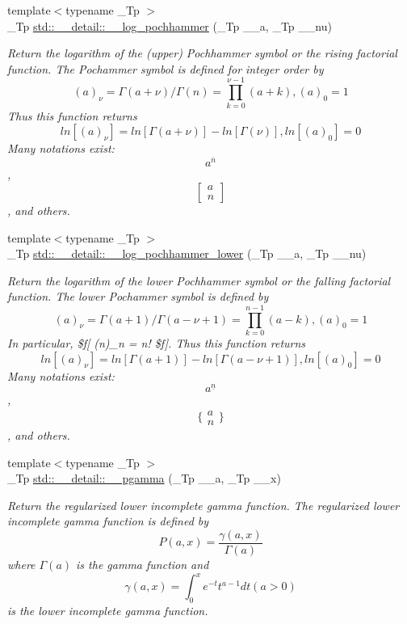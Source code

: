 \begin{DoxyCompactItemize}
\item 
{\footnotesize template$<$typename \+\_\+\+Tp $>$ }\\\+\_\+\+Tp \hyperlink{namespacestd_1_1____detail_a662ea050ddbb017ae6f5f981e95d8e71}{std\+::\+\_\+\+\_\+detail\+::\+\_\+\+\_\+log\+\_\+pochhammer} (\+\_\+\+Tp \+\_\+\+\_\+a, \+\_\+\+Tp \+\_\+\+\_\+nu)
\begin{DoxyCompactList}\small\item\em Return the logarithm of the (upper) Pochhammer symbol or the rising factorial function. The Pochammer symbol is defined for integer order by \[ (a)_\nu = \Gamma(a + \nu) / \Gamma(n) = \prod_{k=0}^{\nu-1} (a + k), (a)_0 = 1 \] Thus this function returns \[ ln[(a)_\nu] = ln[\Gamma(a + \nu)] - ln[\Gamma(\nu)], ln[(a)_0] = 0 \] Many notations exist\+: \[ a^{\overline{n}} \], \[ \left[ \begin{array}{c} a \\ n \end{array} \right] \], and others. \end{DoxyCompactList}\item 
{\footnotesize template$<$typename \+\_\+\+Tp $>$ }\\\+\_\+\+Tp \hyperlink{namespacestd_1_1____detail_ac647507ca578c270d3cd7a4c02e68dbb}{std\+::\+\_\+\+\_\+detail\+::\+\_\+\+\_\+log\+\_\+pochhammer\+\_\+lower} (\+\_\+\+Tp \+\_\+\+\_\+a, \+\_\+\+Tp \+\_\+\+\_\+nu)
\begin{DoxyCompactList}\small\item\em Return the logarithm of the lower Pochhammer symbol or the falling factorial function. The lower Pochammer symbol is defined by \[ (a)_\nu = \Gamma(a + 1) / \Gamma(a - \nu + 1) = \prod_{k=0}^{n-1} (a - k), (a)_0 = 1 \] In particular, \$f\mbox{[} (n)\+\_\+n = n! \$f\mbox{]}. Thus this function returns \[ ln[(a)_\nu] = ln[\Gamma(a + 1)] - ln[\Gamma(a - \nu + 1)], ln[(a)_0] = 0 \] Many notations exist\+: \[ a^{\underline{n}} \], \[ \{ \begin{array}{c} a \\ n \end{array} \} \], and others. \end{DoxyCompactList}\item 
{\footnotesize template$<$typename \+\_\+\+Tp $>$ }\\\+\_\+\+Tp \hyperlink{namespacestd_1_1____detail_a009273f90a2496eb24abf92cd957b851}{std\+::\+\_\+\+\_\+detail\+::\+\_\+\+\_\+pgamma} (\+\_\+\+Tp \+\_\+\+\_\+a, \+\_\+\+Tp \+\_\+\+\_\+x)
\begin{DoxyCompactList}\small\item\em Return the regularized lower incomplete gamma function. The regularized lower incomplete gamma function is defined by \[ P(a,x) = \frac{\gamma(a,x)}{\Gamma(a)} \] where $ \Gamma(a) $ is the gamma function and \[ \gamma(a,x) = \int_0^x e^{-t}t^{a-1}dt (a > 0) \] is the lower incomplete gamma function. \end{DoxyCompactList}\item 

\end{DoxyCompactItemize}
